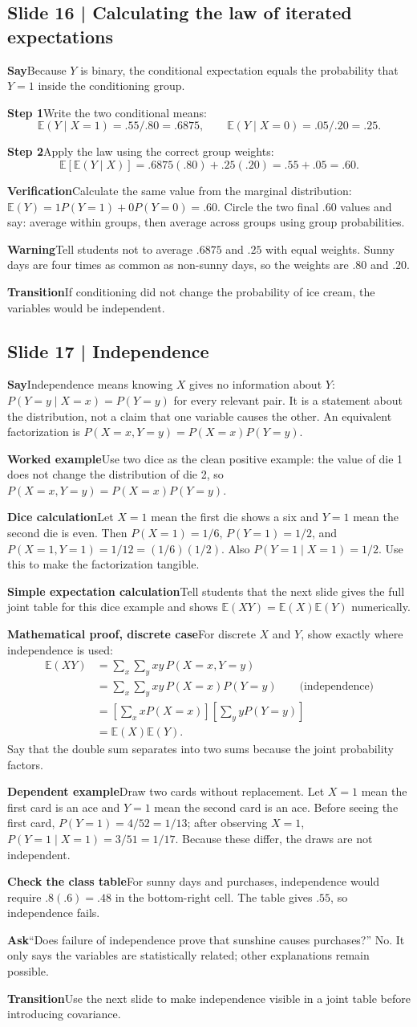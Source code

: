 \documentclass[11pt,a4paper]{article}
\newcommand{\slideheading}[1]{\subsection*{\color{accent}#1}}
\newcommand{\cue}[2]{\par\noindent\textbf{#1}\quad #2\par}
\newcommand{\E}{\mathbb{E}}
\begin{document}
\slideheading{Slide 16 | Calculating the law of iterated expectations}
\cue{Say}{Because $Y$ is binary, the conditional expectation equals the probability that $Y=1$ inside the conditioning group.}
\cue{Step 1}{Write the two conditional means: \[\E(Y\mid X=1)=.55/.80=.6875,\qquad \E(Y\mid X=0)=.05/.20=.25.\]}
\cue{Step 2}{Apply the law using the correct group weights: \[\E[\E(Y\mid X)]=.6875(.80)+.25(.20)=.55+.05=.60.\]}
\cue{Verification}{Calculate the same value from the marginal distribution: $\E(Y)=1P(Y=1)+0P(Y=0)=.60$. Circle the two final $.60$ values and say: average within groups, then average across groups using group probabilities.}
\cue{Warning}{Tell students not to average $.6875$ and $.25$ with equal weights. Sunny days are four times as common as non-sunny days, so the weights are $.80$ and $.20$.}
\cue{Transition}{If conditioning did not change the probability of ice cream, the variables would be independent.}

\slideheading{Slide 17 | Independence}
\cue{Say}{Independence means knowing $X$ gives no information about $Y$: $P(Y=y\mid X=x)=P(Y=y)$ for every relevant pair. It is a statement about the distribution, not a claim that one variable causes the other. An equivalent factorization is $P(X=x,Y=y)=P(X=x)P(Y=y)$.}
\cue{Worked example}{Use two dice as the clean positive example: the value of die 1 does not change the distribution of die 2, so $P(X=x,Y=y)=P(X=x)P(Y=y)$.}
\cue{Dice calculation}{Let $X=1$ mean the first die shows a six and $Y=1$ mean the second die is even. Then $P(X=1)=1/6$, $P(Y=1)=1/2$, and $P(X=1,Y=1)=1/12=(1/6)(1/2)$. Also $P(Y=1\mid X=1)=1/2$. Use this to make the factorization tangible.}
\cue{Simple expectation calculation}{Tell students that the next slide gives the full joint table for this dice example and shows $\E(XY)=\E(X)\E(Y)$ numerically.}
\cue{Mathematical proof, discrete case}{For discrete $X$ and $Y$, show exactly where independence is used: \[\begin{aligned}\E(XY)
&=\sum_x\sum_y xy\,P(X=x,Y=y)\\
&=\sum_x\sum_y xy\,P(X=x)P(Y=y)\qquad\text{(independence)}\\
&=\left[\sum_x xP(X=x)\right]\left[\sum_y yP(Y=y)\right]\\
&=\E(X)\E(Y).
\end{aligned}\] Say that the double sum separates into two sums because the joint probability factors.}
\cue{Dependent example}{Draw two cards without replacement. Let $X=1$ mean the first card is an ace and $Y=1$ mean the second card is an ace. Before seeing the first card, $P(Y=1)=4/52=1/13$; after observing $X=1$, $P(Y=1\mid X=1)=3/51=1/17$. Because these differ, the draws are not independent.}
\cue{Check the class table}{For sunny days and purchases, independence would require $.8(.6)=.48$ in the bottom-right cell. The table gives $.55$, so independence fails.}
\cue{Ask}{``Does failure of independence prove that sunshine causes purchases?'' No. It only says the variables are statistically related; other explanations remain possible.}
\cue{Transition}{Use the next slide to make independence visible in a joint table before introducing covariance.}
\end{document}
